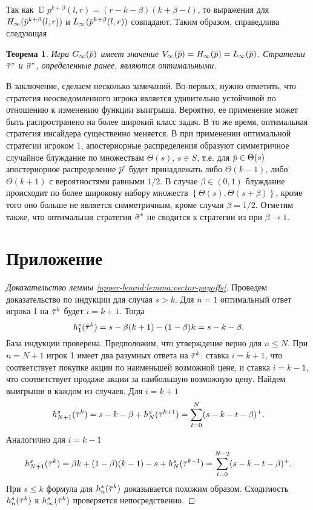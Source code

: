 \documentclass[12pt, draft]{extarticle}
\newtheorem{theorem}{Теорема}
\newcommand{\overbar}[1]%
{\mkern 1.5mu\overline{\mkern-1.3mu#1\mkern-1.3mu}\mkern 1.3mu}
\newcommand{\p}{\ensuremath{\overbar{p}}}
\DeclareMathOperator{\D}{\mathbb{D}}
\newcommand{\G}[1][n]{\ensuremath{G_{#1}}}
\newcommand{\V}[1][n]{\ensuremath{V_{#1}}}
\newcommand{\High}[1][\ensuremath{\infty}]{\ensuremath{H_{#1}}}
\newcommand{\sigmav}{\ensuremath{\overbar{\sigma}}}
\newcommand{\tauv}{\ensuremath{\overbar{\tau}}}
\newcommand{\Low}[1][\ensuremath{\infty}]{\ensuremath{L_{#1}}}
\begin{document}
Так как $\D p^{k+\beta}(l, r) = (r-k-\beta)(k+\beta-l)$, то выражения для
$\High(\p^{k+\beta}(l,r))$ и $\Low(\p^{k+\beta}(l,r))$ совпадают. Таким образом,
справедлива следующая
\begin{theorem}
  \label{solution:theorem}
  Игра $\G[\infty](\p)$ имеет значение $\V[\infty](\p) = \High(\p) = \Low(\p)$.
  Стратегии $\tauv^*$ и $\sigmav^*$, определенные ранее, являются оптимальными.
\end{theorem}

В заключение, сделаем несколько замечаний. Во-первых, нужно отметить, что
стратегия неосведомленного игрока является удивительно устойчивой по отношению к
изменению функции выигрыша. Вероятно, ее применение может быть распространено на
более широкий класс задач. В то же время, оптимальная стратегия инсайдера
существенно меняется. В \cite{bib:domansky11} при применении оптимальной
стратегии игроком 1, апостериорные распределения образуют симметричное случайное
блуждание по множествам $\Theta(s), \, s \in S$, т.е. для $\p \in \Theta(s)$
апостериорное распределение $\p'$ будет принадлежать либо $\Theta(k-1)$, либо
$\Theta(k+1)$ с вероятностями равными $1/2$. В случае $\beta \in (0, 1)$
блуждание происходит по более широкому набору множеств %
$\left\{ \Theta(s), \Theta(s+\beta) \right\}$, %
кроме того оно больше не является симметричным, кроме случая $\beta = 1/2$.
Отметим также, что оптимальная стратегия $\sigmav^*$ не сводится к стратегии из
\cite{bib:domansky11} при $\beta \rightarrow 1$.

\appendix
\setcounter{secnumdepth}{0}
\section{Приложение}

\begin{proof}[Доказательство леммы \ref{upper-bound:lemma:vector-payoffs}]
  Проведем доказательство по индукции для случая $s > k$. Для $n = 1$
  оптимальный ответ игрока 1 на $\tauv^k$ будет $i = k + 1$. Тогда
  \begin{equation*}
    h^s_1(\tauv^k) = s - \beta(k+1) - (1-\beta)k = s - k - \beta.
  \end{equation*}
  База индукции проверена. Предположим, что утверждение верно для $n \leqslant
  N$. При $n = N + 1$ игрок 1 имеет два разумных ответа на $\tauv^k$: ставка $i
  = k + 1$, что соответствует покупке акции по наименьшей возможной цене, и
  ставка $i = k - 1$, что соответствует продаже акции за наибольшую возможную
  цену. Найдем выигрыши в каждом из случаев. Для $i = k + 1$
  \begin{equation*}
    h^s_{N+1}(\tauv^k) = s - k - \beta + h^s_N(\tauv^{k+1}) =
    \sum_{t=0}^N(s-k-t-\beta)^+.
  \end{equation*}
  Аналогично для $i = k - 1$
  \begin{equation*}
    h^s_{N+1}(\tauv^k) = \beta k + (1-\beta)(k-1) - s + h^s_N(\tauv^{k-1}) =
    \sum_{t=0}^{N-2}(s-k-t-\beta)^+.
  \end{equation*}
  При $s \leqslant k$ формула для $h^s_n(\tauv^k)$ доказывается похожим образом.
  Сходимость $h^s_n(\tauv^k)$ к $h^s_\infty(\tauv^k)$ проверяется
  непосредственно.
\end{proof}
\end{document}
